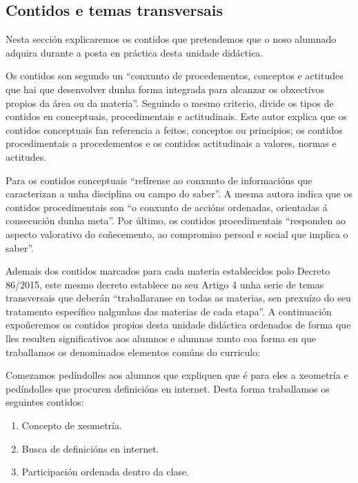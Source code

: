 \subsection{Contidos e temas transversais}\label{sec:contidos}

Nesta sección explicaremos os contidos que pretendemos que o noso alumnado adquira durante a posta en práctica desta unidade didáctica.

Os contidos son segundo \cite{orientacionesgobvasco} un ``conxunto de procedementos, conceptos e actitudes que hai que desenvolver dunha forma integrada para alcanzar os obxectivos propios da área ou da materia''. Seguindo o mesmo criterio,  divide os tipos de contidos en conceptuais, procedimentais e actitudinais. Este autor explica que os contidos conceptuais fan referencia a feitos, conceptos ou principios; os contidos procedimentais a procedementos e os contidos actitudinais a valores, normas e actitudes.

Para  os contidos conceptuais ``refírense ao conxunto de informacións que caracterizan a unha disciplina ou campo do saber''. A mesma autora indica que os contidos procedimentais son ``o conxunto de accións ordenadas, orientadas á consecución dunha meta''. Por último, os contidos procedimentais ``responden ao aspecto valorativo do coñecemento, ao compromiso persoal e social que implica o saber''.

Ademais dos contidos marcados para cada materia establecidos polo Decreto 86/2015, este mesmo decreto establece no seu Artigo 4 unha serie de temas transversais que deberán ``traballaranse en todas as materias, sen prexuízo do seu tratamento específico nalgunhas das materias de cada etapa''. A continuación expoñeremos os contidos propios desta unidade didáctica ordenados de forma que lles resulten significativos aos alumnos e alumnas xunto coa forma en que traballamos os denominados elementos comúns do curriculo:

Comezamos pedíndolles aos alumnos que expliquen que é para eles a xeometría e pedíndolles que procuren definicións en internet. Desta forma traballamos os seguintes contidos:

\begin{enumerate}[label=\bfseries Con\arabic*, align=left, leftmargin=1.5cm]
    \item\label{con:xeometria} Concepto de xeometría.
    \item\label{con:buscadefinicions} Busca de definicións en internet.
    \item\label{con:participacionclase} Participación ordenada dentro da clase.
\end{enumerate}

